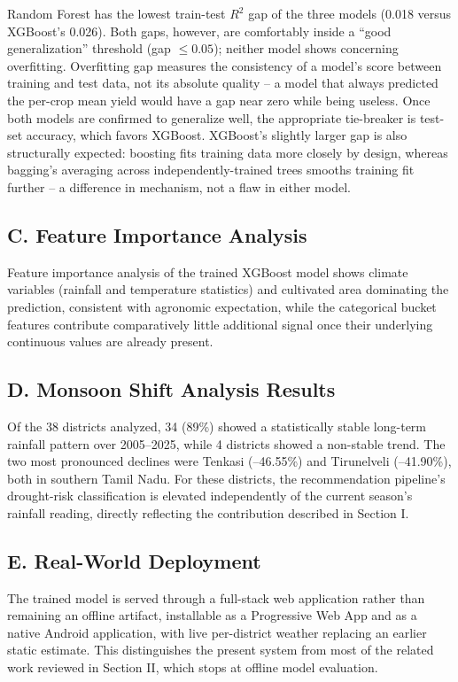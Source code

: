 \documentclass[12pt,a4paper,twocolumn]{article}
\begin{document}
Random Forest has the lowest train-test $R^2$ gap of the three models (0.018 versus
XGBoost's 0.026). Both gaps, however, are comfortably inside a ``good
generalization'' threshold (gap $\leq 0.05$); neither model shows concerning
overfitting. Overfitting gap measures the consistency of a model's score between
training and test data, not its absolute quality -- a model that always predicted the
per-crop mean yield would have a gap near zero while being useless. Once both models
are confirmed to generalize well, the appropriate tie-breaker is test-set accuracy,
which favors XGBoost. XGBoost's slightly larger gap is also structurally expected:
boosting fits training data more closely by design, whereas bagging's averaging
across independently-trained trees smooths training fit further -- a difference in
mechanism, not a flaw in either model.

\subsection*{C. Feature Importance Analysis}

Feature importance analysis of the trained XGBoost model shows climate variables
(rainfall and temperature statistics) and cultivated area dominating the prediction,
consistent with agronomic expectation, while the categorical bucket features
contribute comparatively little additional signal once their underlying continuous
values are already present.

\subsection*{D. Monsoon Shift Analysis Results}

Of the 38 districts analyzed, 34 (89\%) showed a statistically stable long-term
rainfall pattern over 2005--2025, while 4 districts showed a non-stable trend. The
two most pronounced declines were Tenkasi (--46.55\%) and Tirunelveli (--41.90\%),
both in southern Tamil Nadu. For these districts, the recommendation pipeline's
drought-risk classification is elevated independently of the current season's
rainfall reading, directly reflecting the contribution described in Section I.

\subsection*{E. Real-World Deployment}

The trained model is served through a full-stack web application rather than
remaining an offline artifact, installable as a Progressive Web App and as a native
Android application, with live per-district weather replacing an earlier static
estimate. This distinguishes the present system from most of the related work
reviewed in Section II, which stops at offline model evaluation.
\end{document}
